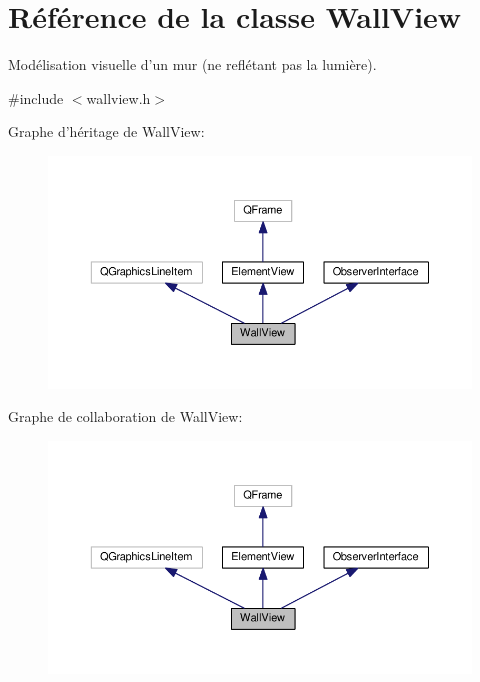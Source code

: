 \hypertarget{classWallView}{\section{Référence de la classe Wall\+View}
\label{classWallView}
}


Modélisation visuelle d’un mur (ne reflétant pas la lumière).  




{\ttfamily \#include $<$wallview.\+h$>$}



Graphe d'héritage de Wall\+View\+:\nopagebreak
\begin{figure}[H]
\begin{center}
\leavevmode
\includegraphics[width=350pt]{dd/dc1/classWallView__inherit__graph}
\end{center}
\end{figure}


Graphe de collaboration de Wall\+View\+:\nopagebreak
\begin{figure}[H]
\begin{center}
\leavevmode
\includegraphics[width=350pt]{d1/d8b/classWallView__coll__graph}
\end{center}
\end{figure}
